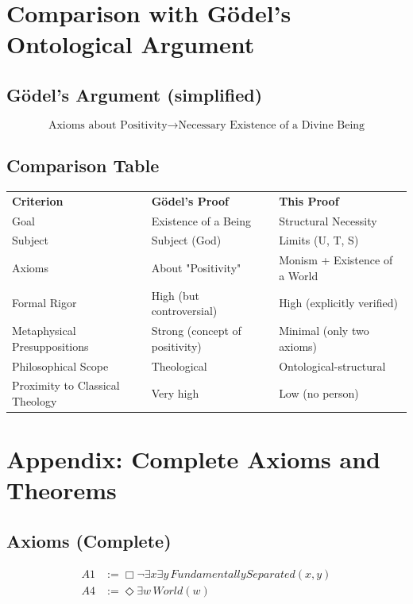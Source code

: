 \documentclass[
]{article}
\begin{document}
\section{Comparison with Gödel's Ontological Argument}\label{comparison-with-goumldels-ontological-argument}

\subsection{Gödel's Argument (simplified)}\label{goumldels-argument-simplified}

\[
\text{Axioms about Positivity} \rightarrow \text{Necessary Existence of a Divine Being}
\]

\subsection{Comparison Table}\label{comparison-table}

\begin{tabular}{lll}
\textbf{Criterion} & \textbf{Gödel's Proof} & \textbf{This Proof} \\
Goal & Existence of a Being & Structural Necessity \\
Subject & Subject (God) & Limits (U, T, S) \\
Axioms & About "Positivity" & Monism + Existence of a World \\
Formal Rigor & High (but controversial) & High (explicitly verified) \\
Metaphysical Presuppositions & Strong (concept of positivity) & Minimal (only two axioms) \\
Philosophical Scope & Theological & Ontological-structural \\
Proximity to Classical Theology & Very high & Low (no person) \\
\end{tabular}

\section{Appendix: Complete Axioms and Theorems}\label{appendix-complete-axioms-and-theorems}

\subsection{Axioms (Complete)}\label{axioms-complete}

\[
\begin{aligned}
A1 &:= \Box\neg\exists x\exists y\, FundamentallySeparated(x,y) \\
A4 &:= \Diamond\exists w\, World(w)
\end{aligned}
\]
\end{document}
